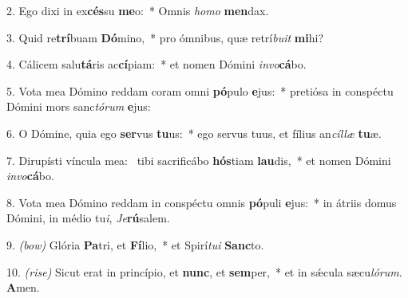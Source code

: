 2. Ego dixi in ex\textbf{cés}su \textbf{me}o:~* Omnis \textit{ho}\textit{mo} \textbf{men}dax.

3. Quid re\textbf{trí}buam \textbf{Dó}mino,~* pro ómnibus, quæ retrí\textit{bu}\textit{it} \textbf{mi}hi?

4. Cálicem salu\textbf{tá}ris ac\textbf{cí}piam:~* et nomen Dómini \textit{in}\textit{vo}\textbf{cá}bo.

5. Vota mea Dómino reddam coram omni \textbf{pó}pulo \textbf{e}jus:~* pretiósa in conspéctu Dómini mors sanc\textit{tó}\textit{rum} \textbf{e}jus:

6. O Dómine, quia ego \textbf{ser}vus \textbf{tu}us:~* ego servus tuus, et fílius an\textit{cíl}\textit{læ} \textbf{tu}æ.

7. Dirupísti víncula mea:~{\color{red}\GreDagger} tibi sacrificábo \textbf{hós}tiam \textbf{lau}dis,~* et nomen Dómini \textit{in}\textit{vo}\textbf{cá}bo.

8. Vota mea Dómino reddam in conspéctu omnis \textbf{pó}puli \textbf{e}jus:~* in átriis domus Dómini, in médio tu\textit{i}, \textit{Je}\textbf{rú}salem.

9. {\color{red}\textit{(bow)}} Glória \textbf{Pa}tri, et \textbf{Fí}lio,~* et Spirí\textit{tu}\textit{i} \textbf{Sanc}to.

10. {\color{red}\textit{(rise)}} Sicut erat in princípio, et \textbf{nunc}, et \textbf{sem}per,~* et in s\'{\ae}cula sæcu\textit{ló}\textit{rum}. \textbf{A}men.
